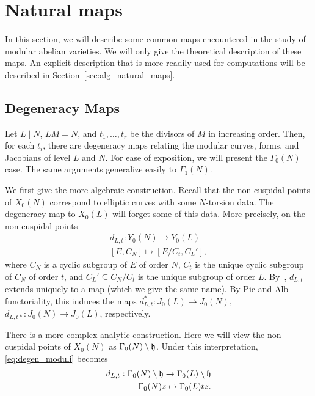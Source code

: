 \documentclass[11pt, proquest]{uwthesis}
\begin{document}
\section{Natural maps}%
\label{sec:natural_maps}

In this section, we will describe some common maps encountered in the study of
modular abelian varieties. We will only give the theoretical description of
these maps. An explicit description that is more readily used for computations
will be described in Section~\ref{sec:alg_natural_maps}.

\subsection{Degeneracy Maps}%
\label{sub:degeneracy_maps}

Let $L\mid N$, $LM=N$, and $t_1,\ldots,t_r$ be the divisors of $M$ in
increasing order. Then, for each $t_i$, there are degeneracy maps relating the
modular curves, forms, and Jacobians of level $L$ and $N$. For ease of
exposition, we will present the $\Gamma_0(N)$ case. The same arguments
generalize easily to $\Gamma_1(N)$.

We first give the more algebraic construction. Recall that the non-cuspidal
points of $X_0(N)$ correspond to elliptic curves with some $N$-torsion data.
The degeneracy map to $X_0(L)$ will forget some of this data. More precisely,
on the non-cuspidal points
\begin{equation}
    \label{eq:degen_moduli}
    \begin{split}
        d_{L,t}: Y_0(N)  \to Y_0(L) \\
        [ E, C_N ]       \mapsto [ E/C_t, C_L ' ],
    \end{split}
\end{equation}
where $C_N$ is a cyclic subgroup of $E$ of order $N$, $C_t$ is the unique
cyclic subgroup of $C_N$ of order $t$, and $C_L '\subseteq C_N/C_t$ is the
unique subgroup of order $L$. By~\cite[Chap. 1, Prop. 6.8]{hartshorne},
$d_{L,t}$ extends uniquely to a map (which we give the same name). By Pic and
Alb functoriality, this induces the maps $d_{L,t} ^*:J_0(L)\to J_0(N)$, $d_{L,
t*} :J_0(N)\to J_0(L)$, respectively.

There is a more complex-analytic construction. Here we will view the
non-cuspidal points of $X_0(N)$ as $\Gamma_0(N)\setminus \mathfrak{h}$. Under this
interpretation, \eqref{eq:degen_moduli} becomes
\begin{equation}
    \label{eq:degen_analytic}
    \begin{split}
        d_{L,t}: \Gamma_0(N)\setminus \mathfrak{h} \to \Gamma_0(L)\setminus \mathfrak{h} \\
        \Gamma_0(N)z\mapsto \Gamma_0(L) tz.
    \end{split}
\end{equation}
\end{document}
